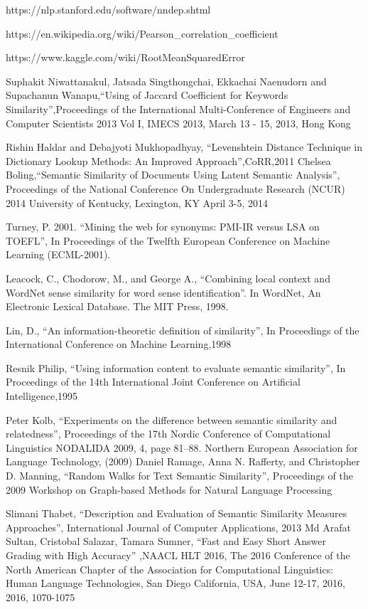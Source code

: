 \documentclass{article}
\begin{document}
\begin{thebibliography}{9}
https://nlp.stanford.edu/software/nndep.shtml

https://en.wikipedia.org/wiki/Pearson\_correlation\_coefficient


https://www.kaggle.com/wiki/RootMeanSquaredError

Suphakit Niwattanakul, Jatsada Singthongchai, Ekkachai Naenudorn and Supachanun Wanapu,``Using of Jaccard Coefficient for Keywords
Similarity'',Proceedings of the International Multi-Conference of Engineers and Computer Scientists 2013 Vol I,
IMECS 2013, March 13 - 15, 2013, Hong Kong

Rishin Haldar and Debajyoti Mukhopadhyay, ``Levenshtein Distance Technique in Dictionary Lookup
Methods: An Improved Approach'',CoRR,2011
Chelsea Boling,``Semantic Similarity of Documents Using Latent Semantic Analysis'', Proceedings of the National Conference On Undergraduate Research (NCUR) 2014 University of Kentucky, Lexington, KY April 3-5, 2014

Turney, P. 2001. ``Mining the web for synonyms: PMI-IR versus
LSA on TOEFL'', In Proceedings of the Twelfth European Conference
on Machine Learning (ECML-2001).

Leacock, C., Chodorow, M., and George A.,  ``Combining local context and WordNet sense similarity for word sense identification''. In WordNet, An Electronic Lexical Database. The MIT Press, 1998.

Lin, D., ``An information-theoretic definition of similarity'',
In Proceedings of the International Conference on Machine Learning,1998

Resnik Philip, ``Using information content to evaluate semantic similarity'', In Proceedings of the 14th International Joint Conference
on Artificial Intelligence,1995

Peter Kolb, ``Experiments on the difference between semantic
similarity and relatedness'', Proceedings of the 17th Nordic Conference of Computational Linguistics NODALIDA 2009, 4, page 81--88. Northern European Association for Language Technology, (2009)
Daniel Ramage, Anna N. Rafferty, and Christopher D. Manning, ``Random Walks for Text Semantic Similarity'', Proceedings of the 2009 Workshop on Graph-based Methods for Natural Language Processing

Slimani Thabet, ``Description and Evaluation of Semantic Similarity Measures Approaches'', International Journal of Computer Applications, 2013
Md Arafat Sultan, Cristobal Salazar, Tamara Sumner, ``Fast and Easy Short Answer Grading with High Accuracy'' ,NAACL HLT 2016, The 2016 Conference of the North American Chapter of the Association for Computational Linguistics: Human Language Technologies, San Diego California, USA, June 12-17, 2016, 2016, 1070-1075


\end{thebibliography}
\end{document}
